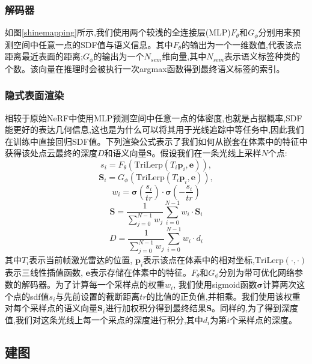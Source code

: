 \subsubsection{解码器}
如图\ref{shinemapping}所示,我们使用两个较浅的全连接层(MLP)$F_\theta$和$G_\phi$分别用来预测空间中任意一点的SDF值与语义信息。其中$F_\theta$的输出为一个一维数值,代表该点距离最近表面的距离;$G_\phi$的输出为一个$N_{sem}$维向量,其中$N_{sem}$表示语义标签种类的个数。该向量在推理时会被执行一次argmax函数得到最终语义标签的索引。
\subsubsection{隐式表面渲染}
相较于原始NeRF中使用MLP预测空间中任意一点的体密度,也就是占据概率,SDF能更好的表达几何信息,这也是为什么可以将其用于光线追踪中等任务中,因此我们在训练中直接回归SDF值。下列渲染公式表示了我们如何从嵌套在体素中的特征中获得该处点云最终的深度$D$和语义向量$\mathbf{S}$。假设我们在一条光线上采样$N$个点:
\begin{equation}
    s_i=F_\theta(\mbox{TriLerp}(T_i\mathbf{p}_i,\mathbf{e})),
\end{equation}
\begin{equation}
    \mathbf{S}_i=G_\phi(\mbox{TriLerp}(T_i\mathbf{p}_i,\mathbf{e})),
\end{equation}
\begin{equation}
    w_i=\mathbf{\sigma}(\frac{s_i}{tr})\cdot\mathbf{\sigma}(-\frac{s_i}{tr})
\end{equation}
\begin{equation}
    \mathbf{S} = \frac{1}{\sum_{j=0}^{N-1}w_j}\sum_{i=0}^{N-1}w_i\cdot\mathbf{S}_i
\end{equation}
\begin{equation}
    D = \frac{1}{\sum_{j=0}^{N-1}w_j}\sum_{i=0}^{N-1}w_i\cdot d_i
\end{equation}
其中$T_i$表示当前帧激光雷达的位置, $\mathbf{p}_i$表示该点在体素中的相对坐标,$\mbox{TriLerp}(\cdot , \cdot)$表示三线性插值函数, $\mathbf{e}$表示存储在体素中的特征。$F_\theta\mbox{和}G_\phi$分别为带可优化网络参数的解码器。为了计算每一个采样点的权重$w_i$, 我们使用sigmoid函数$\mathbf{\sigma}$计算两次这个点的sdf值$s_i$与先前设置的截断距离$tr$的比值的正负值,并相乘。我们使用该权重对每个采样点的语义向量$\mathbf{S}_i$进行加权积分得到最终结果$\mathbf{S}$。同样的,为了得到深度值,我们对这条光线上每一个采点的深度进行积分,其中$d_i$为第$i$个采样点的深度。
\subsection{建图}
